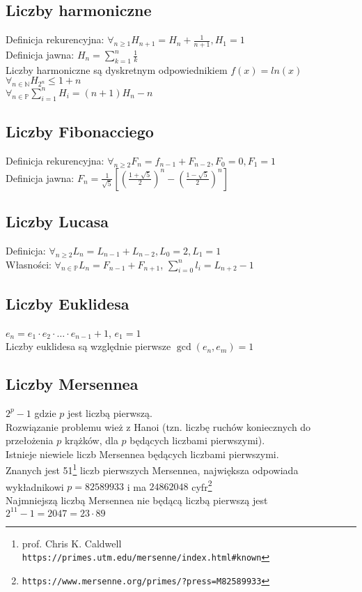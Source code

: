 \documentclass[a4paper,12pt]{article}
\begin{document}
\subsection{Liczby harmoniczne} %
Definicja rekurencyjna: $\forall_{n\geq1}H_{n+1}=H_n+\frac{1}{n+1}, H_1=1$ \\
Definicja jawna: $H_n=\sum_{k=1}^n\frac{1}{k}$ \\
Liczby harmoniczne są dyskretnym odpowiednikiem $f(x)=ln(x)$ \\
$\forall_{n\in \mathbb{N}} H_{2^n}\leq1+n$ \\
$\forall_{n \in \mathbb{P}}\sum_{i=1}^n H_i=(n+1)H_n-n$
\subsection{Liczby Fibonacciego}
Definicja rekurencyjna: $\forall_{n\geq2} F_n=f_{n-1}+F_{n-2}, F_0=0, F_1=1$ \\
Definicja jawna: $F_n=\frac{1}{\sqrt{5}}[(\frac{1+\sqrt{5}}{2})^n - (\frac{1-\sqrt{5}}{2})^n]$
\subsection{Liczby Lucasa}
Definicja: $\forall_{n\geq2} L_n=L_{n-1} +L_{n-2}, L_0=2, L_1=1$\\
Własności: $\forall_{n\in\mathbb{P}} L_n=F_{n-1} +F_{n+1}$, $\sum_{i=0}^n l_i=L_{n+2}-1$
\subsection{Liczby Euklidesa}
$e_n=e_1\cdot e_2 \cdot \hdots \cdot e_{n-1} + 1$, $e_1=1$\\
Liczby euklidesa są względnie pierwsze $\gcd(e_n,e_m)=1$
\subsection{Liczby Mersennea}
$2^p-1$ gdzie $p$ jest liczbą pierwszą.\\
Rozwiązanie problemu wież z Hanoi (tzn. liczbę ruchów koniecznych do przełożenia $p$ krążków, dla $p$ będących liczbami pierwszymi).\\
Istnieje niewiele liczb Mersennea będących liczbami pierwszymi.\\
Znanych jest 51\footnote{prof. Chris K. Caldwell \verb+https://primes.utm.edu/mersenne/index.html#known+} liczb pierwszych Mersennea, największa odpowiada wykładnikowi $p=82589933$ i ma $24 862 048$ cyfr\footnote{\verb+https://www.mersenne.org/primes/?press=M82589933+}\\
Najmniejszą liczbą Mersennea nie będącą liczbą pierwszą jest $2^{11}-1=2047=23\cdot89$
\end{document}
